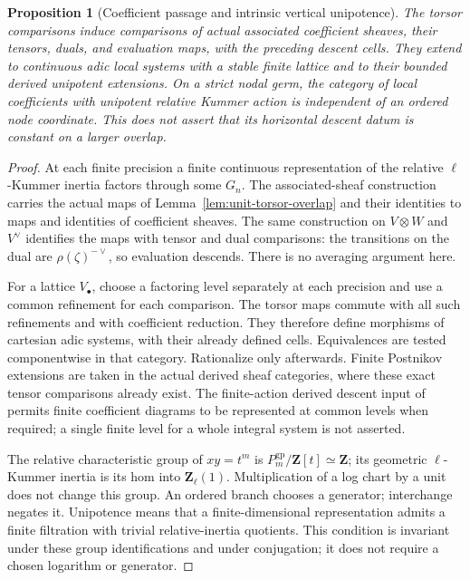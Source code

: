\documentclass[11pt]{article}
\newtheorem{proposition}[theorem]{Proposition}
\theoremstyle{definition}
\theoremstyle{remark}
\begin{document}
\begin{proposition}[Coefficient passage and intrinsic vertical unipotence]
\label{prop:coordinate-coefficients}
The torsor comparisons induce comparisons of actual associated
coefficient sheaves, their tensors, duals, and evaluation maps, with
the preceding descent cells.  They extend to continuous adic local
systems with a stable finite lattice and to their bounded derived
unipotent extensions.  On a strict nodal germ, the category of local
coefficients with unipotent relative Kummer action is independent of
an ordered node coordinate.  This does not assert that its horizontal
descent datum is constant on a larger overlap.
\end{proposition}
\begin{proof}
At each finite precision a finite continuous representation of the
relative $\ell$-Kummer inertia factors through some $G_n$.  The associated-sheaf construction carries the
actual maps of Lemma~\ref{lem:unit-torsor-overlap} and their identities
to maps and identities of coefficient sheaves.  The same construction
on $V\otimes W$ and $V^\vee$ identifies the maps with tensor and dual
comparisons: the transitions on the dual are $\rho(\zeta)^{-\vee}$,
so evaluation descends.  There is no averaging argument here.

For a lattice $V_\bullet$, choose a factoring level separately at
each precision and use a common refinement for each comparison.
The torsor maps commute with all such refinements and with coefficient
reduction.  They therefore define morphisms of cartesian adic systems,
with their already defined cells.  Equivalences are tested componentwise
in that category.  Rationalize only afterwards.  Finite Postnikov
extensions are taken in the actual derived sheaf categories, where
these exact tensor comparisons already exist.  The finite-action
derived descent input of \cite{Local} permits finite coefficient
diagrams to be represented at common levels when required; a single
finite level for a whole integral system is not asserted.

The relative characteristic group of $xy=t^m$ is
$P_m^{\mathrm{gp}}/\mathbf Z[t]\simeq\mathbf Z$; its geometric
$\ell$-Kummer inertia is its hom into $\mathbf Z_\ell(1)$.
Multiplication of a log chart by a unit does not change this group.
An ordered branch chooses a generator; interchange negates it.
Unipotence means that a finite-dimensional representation admits a
finite filtration with trivial relative-inertia quotients.  This
condition is invariant under these group identifications and under
conjugation; it does not require a chosen logarithm or generator.


\end{proof}
\end{document}

